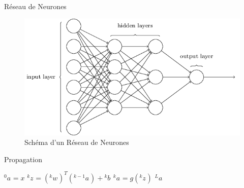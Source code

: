 \documentclass[11pt]{beamer}
\newcommand{\lexp}[1]{\phantom{}^{#1}}
\newcommand{\elem}[4]{\lexp{#2}#1^{#3}_{#4}}
\begin{document}
\begin{frame}{Réseau de Neurones}
\begin{figure}[H]
	\centering
	\includegraphics[scale=0.5]{Images/Neural_Network.png}
	\caption{Schéma d'un Réseau de Neurones}
\end{figure}
\end{frame}

\begin{frame}{Propagation}
	\begin{algorithm}[H]
		\caption{Algorithme de Propagation}
		\begin{algorithmic}
		    \STATE $\elem{a}{0}{}{} = x$
		    	\STATE $\elem{z}{k}{}{} = (\elem{w}{k}{}{})^T(\elem{a}{k-1}{}{}) + \elem{b}{k}{}{}$
		    	\STATE $\elem{a}{k}{}{} = g(\elem{z}{k}{}{})$
		    \ENDFOR
		    \RETURN $\elem{a}{L}{}{}$
		\end{algorithmic}
	\end{algorithm}
\end{frame}
\end{document}
